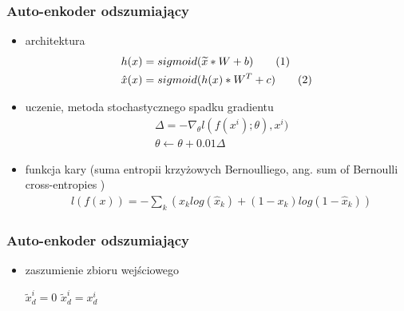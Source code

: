 \documentclass{beamer}
\newcommand\numberthis{\addtocounter{equation}{1}\tag{\theequation}}
\begin{document}

\begin{frame}
\frametitle{Auto-enkoder odszumiający}
\begin{itemize}
    
\item architektura
\begin{align*}
	&h(x) = sigmoid(\widetilde{x}*W+b) 		\numberthis \label{eq:1}\\
	&\hat{x}(x) = sigmoid(h(x)*W^{T}+c) \numberthis \label{eq:2}\\
\end{align*}

    
\item uczenie, metoda stochastycznego spadku gradientu
\begin{align*}
&\Delta = - \nabla_{\theta} l(f(x^{i}); \theta ), x^{i}) \\
&\theta \leftarrow  \theta + 0.01 \Delta   
\end{align*}

\item funkcja kary (suma entropii krzyżowych Bernoulliego, ang. sum of Bernoulli cross-entropies )
\begin{align*}
&l(f(x))=-\sum_{k} (x_{k}log(\hat{x}_{k})+(1-x_{k})log(1-\hat{x}_{k}))   
\end{align*}

\end{itemize}

\end{frame}


\begin{frame}
\frametitle{Auto-enkoder odszumiający}
\begin{itemize}
    
\item zaszumienie zbioru wejściowego
\begin{algorithm}[H]
     {
         {
             {
                 $\widetilde{x}^{i}_{d} = 0$\;
             }
             {
                 $\widetilde{x}^{i}_{d} = x^{i}_{d}$
             }
         }
     }
\end{algorithm}

\end{itemize}

\end{frame}
\end{document}

